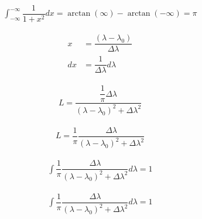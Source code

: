 \begin{align}
   \int_{-\infty}^{-\infty} \dfrac{1}{1 + x^2} dx = \arctan(\infty) - \arctan(-\infty) = \pi
\end{align}


\begin{align}
	x &= \dfrac{\left(\lambda - \lambda_0\right)}{ \Delta \lambda} \\
	dx &= \dfrac{1}{\Delta \lambda} d\lambda
\end{align}

\begin{align}
	L =   \dfrac{\dfrac{1}{\pi} \Delta \lambda}{\left(\lambda - \lambda_0\right)^2 + \Delta \lambda^2}
\end{align}

\begin{align}
	L =  \dfrac{1}{\pi} \dfrac{\Delta \lambda}{\left(\lambda - \lambda_0\right)^2 + \Delta \lambda^2}
\end{align}

\begin{align}
	\int \dfrac{1}{\pi} \dfrac{\Delta \lambda}{\left(\lambda - \lambda_0\right)^2 + \Delta \lambda^2} d\lambda = 1
\end{align}

\begin{align}
	\int \dfrac{1}{\pi} \dfrac{\Delta \lambda}{\left(\lambda - \lambda_0\right)^2 + \Delta \lambda^2} d\lambda = 1
\end{align}


